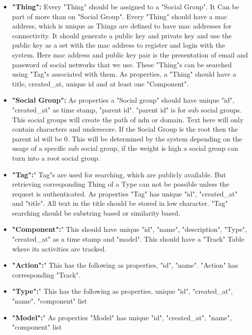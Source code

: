 \documentclass[conference]{IEEEtran}
\begin{document}
\begin{itemize}
  \item 
 \textbf{"Thing":}
 Every "Thing" should be assigned to a "Social Group". It Can be part of more than on "Social Group". Every "Thing" should have a mac address, which is unique as Things are defined to have mac addresses for connectivity. It should generate a public key and private key and use the public key as a set with the mac address to register and login with the system. Here mac address and public key pair is the presentation of email and password of social networks that we use. These "Thing"s can be searched using "Tag"s associated with them. As properties, a "Thing" should have a title, created\_at, unique id and at least one "Component".

\item
 \textbf{"Social Group":} As properties a "Social group" should have unique "id", "created\_at" as time stamp, "parent id". "parent id" is for sub social groups. This social groups will create the path of ndn or domain. Text here will only contain characters and underscore. If the Social Group is the root then the parent id will be 0. This will be determined by the system depending on the usage of a specific sub social group, if the weight is high a social group can turn into a root social group.

\item 
 \textbf{"Tag":}" Tag"s are used for searching, which are publicly available. But retrieving corresponding Thing of a Type can not be possible unless the request is authenticated. As properties "Tag" has unique "id", "created\_at" and "title". All text in the title should be stored in low character. "Tag" searching should be substring based or similarity based.


\item 
 \textbf{"Component":}" This should have unique "id", "name", "description", "Type", "created\_at" as a time stamp and "model". This should have a "Track" Table where its activities are tracked.


\item \textbf{"Action":}" This has the following as properties, "id", "name". "Action" has corresponding "Track".

\item \textbf{"Type":}" This has the following as properties, unique "id", "created\_at", "name", "component" list

\item \textbf{"Model":}" As properties "Model" has unique "id", "created\_at", "name", "component" list
\end{itemize}
\end{document}
